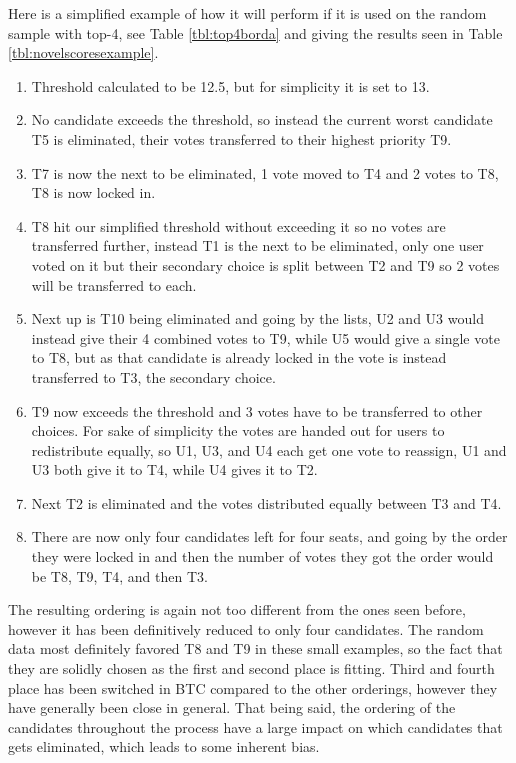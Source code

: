 Here is a simplified example of how it will perform if it is used on the random sample with top-4, see Table \ref{tbl:top4borda} and giving the results seen in Table \ref{tbl:novelscoresexample}.

\begin{enumerate}
	\item Threshold calculated to be 12.5, but for simplicity it is set to 13.
	\item No candidate exceeds the threshold, so instead the current worst candidate T5 is eliminated, their votes transferred to their highest priority T9.
	\item T7 is now the next to be eliminated, 1 vote moved to T4 and 2 votes to T8, T8 is now locked in.
	\item T8 hit our simplified threshold without exceeding it so no votes are transferred further, instead T1 is the next to be eliminated, only one user voted on it but their secondary choice is split between T2 and T9 so 2 votes will be transferred to each.
	\item Next up is T10 being eliminated and going by the lists, U2 and U3 would instead give their 4 combined votes to T9, while U5 would give a single vote to T8, but as that candidate is already locked in the vote is instead transferred to T3, the secondary choice.
	\item T9 now exceeds the threshold and 3 votes have to be transferred to other choices. For sake of simplicity the votes are handed out for users to redistribute equally, so U1, U3, and U4 each get one vote to reassign, U1 and U3 both give it to T4, while U4 gives it to T2.
	\item Next T2 is eliminated and the votes distributed equally between T3 and T4.
	\item There are now only four candidates left for four seats, and going by the order they were locked in and then the number of votes they got the order would be T8, T9, T4, and then T3.
\end{enumerate}

The resulting ordering is again not too different from the ones seen before, however it has been definitively reduced to only four candidates. The random data most definitely favored T8 and T9 in these small examples, so the fact that they are solidly chosen as the first and second place is fitting. Third and fourth place has been switched in BTC compared to the other orderings, however they have generally been close in general. That being said, the ordering of the candidates throughout the process have a large impact on which candidates that gets eliminated, which leads to some inherent bias.

